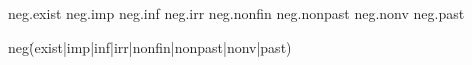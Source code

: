 neg.exist 
neg.imp
neg.inf
neg.irr 
neg.nonfin
neg.nonpast
neg.nonv
neg.past

neg\.(exist|imp|inf|irr|nonfin|nonpast|nonv|past)
